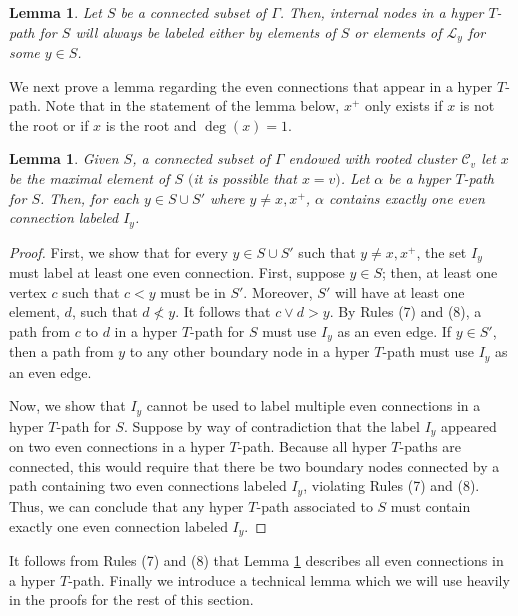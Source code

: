 \documentclass[pdftex]{sigma}
\numberwithin{equation}{section}
\newtheorem{Lemma}[Theorem]{Lemma}
\begin{document}
\begin{Lemma}\label{lem:internalnodes}
Let $S$ be a connected subset of $\Gamma$. Then, internal nodes in a hyper $T$-path for $S$ will always be labeled either by elements of $S$ or elements of $\mathcal{L}_y$ for some $y \in S$.
\end{Lemma}

We next prove a lemma regarding the even connections that appear in a hyper $T$-path. Note that in the statement of the lemma below, $x^+$ only exists if $x$ is not the root or if $x$ is the root and $\deg(x) = 1$.

\begin{Lemma}\label{lem:evenconnections}
Given $S$, a connected subset of $\Gamma$ endowed with rooted cluster $\mathcal{C}_v$ let $x$ be the maximal element of $S$ $($it is possible that $x = v)$. Let $\alpha$ be a hyper $T$-path for $S$. Then, for each $y \in S \cup S'$ where $y \neq x,x^+$, $\alpha$ contains exactly one even connection labeled $I_y$.
\end{Lemma}

\begin{proof}
First, we show that for every $y \in S \cup S'$ such that $y \neq x,x^+$, the set $I_y$ must label at least one even connection. First, suppose $y \in S$; then, at least one vertex $c$ such that $c<y$ must be in $S'$. Moreover, $S'$ will have at least one element, $d$, such that $d \nless y$. It follows that $c \vee d > y$. By Rules (7) and (8), a path from $c$ to $d$ in a hyper $T$-path for $S$ must use $I_y$ as an even edge.
If $y \in S'$, then a path from $y$ to any other boundary node in a hyper $T$-path must use $I_y$ as an even edge.

Now, we show that $I_y$ cannot be used to label multiple even connections in a hyper $T$-path for $S$. Suppose by way of contradiction that the label $I_y$ appeared on two even connections in a hyper $T$-path. Because all hyper $T$-paths are connected, this would require that there be two boundary nodes connected by a path containing two even connections labeled $I_y$, violating Rules (7) and (8). Thus, we can conclude that any hyper $T$-path associated to $S$ must contain exactly one even connection labeled $I_y$.
\end{proof}

It follows from Rules (7) and (8) that Lemma \ref{lem:evenconnections} describes all even connections in a hyper $T$-path.
Finally we introduce a technical lemma which we will use heavily in the proofs for the rest of this section.
\end{document}
